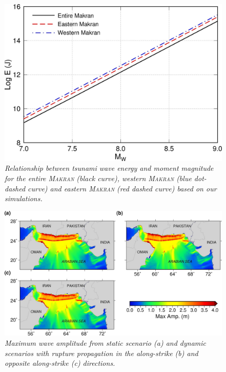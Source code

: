 \documentclass[12pt]{llncs}
\begin{document}
\begin{figure}
\centering
\includegraphics[scale=2]{Fig9.jpg}
\caption{\small\em Relationship between tsunami wave energy and moment magnitude for the entire \textsc{Makran} (black curve), western \textsc{Makran} (blue dot-dashed curve) and eastern \textsc{Makran} (red dashed curve) based on our simulations.}
\label{fig:en_mag}
\end{figure}

\begin{figure}
\centering
\includegraphics[scale=2.5]{Fig10.jpg}
\caption{\small\em Maximum wave amplitude from static scenario (a) and dynamic scenarios with rupture propagation in the along-strike (b) and opposite along-strike (c) directions.}
\label{fig:max}
\end{figure}
\end{document}
